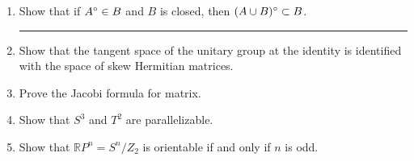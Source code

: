 \documentclass{article}
\begin{document}
\begin{enumerate}
\hrule
\item Show that if $A^\circ\in B$ and $B$ is closed, then $(A\cup B)^\circ\subset B$.

\hrule
\item Show that the tangent space of the unitary group at the identity is identified with the space of skew Hermitian matrices.
\item Prove the Jacobi formula for matrix.
\item Show that $S^3$ and $T^2$ are parallelizable.
\item Show that $\mathbb{R}P^n=S^n/Z_2$ is orientable if and only if $n$ is odd.
\end{enumerate}
\end{document}
